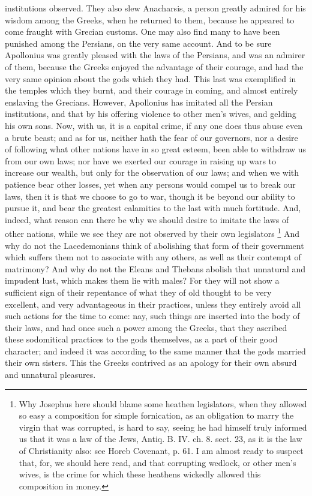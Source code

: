 institutions observed. They also slew Anacharsis, a person greatly admired
for his wisdom among the Greeks, when he returned to them, because he
appeared to come fraught with Grecian customs. One may also find many to
have been punished among the Persians, on the very same account. And to be
sure Apollonius was greatly pleased with the laws of the Persians, and was
an admirer of them, because the Greeks enjoyed the advantage of their
courage, and had the very same opinion about the gods which they had. This
last was exemplified in the temples which they burnt, and their courage in
coming, and almost entirely enslaving the Grecians. However, Apollonius
has imitated all the Persian institutions, and that by his offering
violence to other men's wives, and gelding his own sons. Now, with us, it
is a capital crime, if any one does thus abuse even a brute beast; and as
for us, neither hath the fear of our governors, nor a desire of following
what other nations have in so great esteem, been able to withdraw us from
our own laws; nor have we exerted our courage in raising up wars to
increase our wealth, but only for the observation of our laws; and when we
with patience bear other losses, yet when any persons would compel us to
break our laws, then it is that we choose to go to war, though it be
beyond our ability to pursue it, and bear the greatest calamities to the
last with much fortitude. And, indeed, what reason can there be why we
should desire to imitate the laws of other nations, while we see they are
not observed by their own legislators \footnote{Why Josephus here should
blame some heathen legislators, when they allowed so easy a composition
for simple fornication, as an obligation to marry the virgin that was
corrupted, is hard to say, seeing he had himself truly informed us that it
was a law of the Jews, Antiq. B. IV. ch. 8. sect. 23, as it is the law of
Christianity also: see Horeb Covenant, p. 61. I am almost ready to suspect
that, for, we should here read, and that corrupting wedlock, or other
men's wives, is the crime for which these heathens wickedly allowed this
composition in money.} And why
do not the Lacedemonians think of abolishing that form of their government
which suffers them not to associate with any others, as well as their
contempt of matrimony? And why do not the Eleans and Thebans abolish that
unnatural and impudent lust, which makes them lie with males? For they
will not show a sufficient sign of their repentance of what they of old
thought to be very excellent, and very advantageous in their practices,
unless they entirely avoid all such actions for the time to come: nay,
such things are inserted into the body of their laws, and had once such a
power among the Greeks, that they ascribed these sodomitical practices to
the gods themselves, as a part of their good character; and indeed it was
according to the same manner that the gods married their own sisters. This
the Greeks contrived as an apology for their own absurd and unnatural
pleasures.

